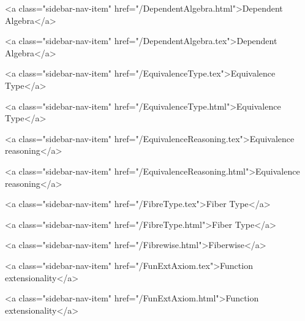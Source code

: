       
    
      
        
          <a class="sidebar-nav-item" href="/DependentAlgebra.html">Dependent Algebra</a>
        
      
    
      
        
          <a class="sidebar-nav-item" href="/DependentAlgebra.tex">Dependent Algebra</a>
        
      
    
      
        
          <a class="sidebar-nav-item" href="/EquivalenceType.tex">Equivalence Type</a>
        
      
    
      
        
          <a class="sidebar-nav-item" href="/EquivalenceType.html">Equivalence Type</a>
        
      
    
      
        
          <a class="sidebar-nav-item" href="/EquivalenceReasoning.tex">Equivalence reasoning</a>
        
      
    
      
        
          <a class="sidebar-nav-item" href="/EquivalenceReasoning.html">Equivalence reasoning</a>
        
      
    
      
        
          <a class="sidebar-nav-item" href="/FibreType.tex">Fiber Type</a>
        
      
    
      
        
          <a class="sidebar-nav-item" href="/FibreType.html">Fiber Type</a>
        
      
    
      
        
          <a class="sidebar-nav-item" href="/Fibrewise.html">Fiberwise</a>
        
      
    
      
        
          <a class="sidebar-nav-item" href="/FunExtAxiom.tex">Function extensionality</a>
        
      
    
      
        
          <a class="sidebar-nav-item" href="/FunExtAxiom.html">Function extensionality</a>
        
